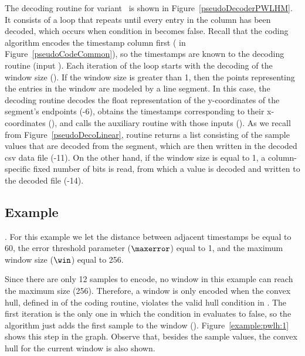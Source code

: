 \clearpage


The decoding routine for variant \maskalgo\ is shown in Figure~\ref{pseudoDecoderPWLHM}. It consists of a loop that repeats until every entry in the column has been decoded, which occurs when condition in  becomes false. Recall that the coding algorithm encodes the timestamp column first ( in Figure~\ref{pseudoCodeCommon}), so the timestamps are known to the decoding routine (input \tscol). Each iteration of the loop starts with the decoding of the window size (). If the window size is greater than 1, then the points representing the entries in the window are modeled by a line segment. In this case, the decoding routine decodes the float representation of the y-coordinates of the segment's endpoints (-6), obtains the timestamps corresponding to their x-coordinates (), and calls the auxiliary routine \decodeSegment with those inputs (). As we recall from Figure~\ref{pseudoDecoLinear}, routine \decodeSegment returns a list consisting of the sample values that are decoded from the segment, which are then written in the decoded csv data file (-11). On the other hand, if the window size is equal to 1, a column-specific fixed number of bits is read, from which a value is decoded and written to the decoded file (-14).







\subsection{Example}
\label{algo:pwlh:example}
\newcommand{\exampleIntro}[1]{\exampleIntroFirst{#1}. For this example we let the distance between adjacent timestamps be equal to 60, the error threshold parameter ($\maxerror$) equal to 1, and the maximum window size ($\win$) equal to 256.}


\exampleIntro{\ref{example:pwlh:1}}


\clearpage


Since there are only 12 samples to encode, no window in this example can reach the maximum size (256). Therefore, a window is only encoded when the convex hull, defined in  of the coding routine, violates the valid hull condition in . The first iteration is the only one in which the condition in  evaluates to false, so the algorithm just adds the first sample to the window (). Figure~\ref{example:pwlh:1} shows this step in the graph. Observe that, besides the sample values, the convex hull for the current window is also shown.


